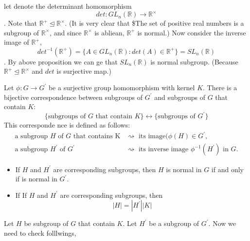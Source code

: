 \documentclass[
]{book}
\providecommand{\tightlist}{%
  \setlength{\itemsep}{0pt}\setlength{\parskip}{0pt}}
\begin{document}
\leavevmode{}%
let denote the determinant homomorphism
\[det:GL_n(\mathbb{R})\to \mathbb{R}^\times\]. Note that
\(\mathbb{R}^+\unlhd \mathbb{R}^\times\). (It is very clear that \$The
set of positive real numbers is a subgroup of \(\mathbb{R}^\times\), and
since \(\mathbb{R}^\times\) is abliean, \(\mathbb{R}^+\) is normal.) Now
consider the inverse image of \(\mathbb{R}^+\),
\[det^{-1}(\mathbb{R}^+)=\{A\in GL_n(\mathbb{R}):det(A)\in \mathbb{R}^+\}=SL_n(\mathbb{R})\].
By above proposition we can ge that \(SL_n(\mathbb{R})\) is normal
subgroup. (Because \(\mathbb{R}^+\unlhd \mathbb{R}^\times\) and \(det\)
is surjective map.)

\leavevmode{}%
Let \(\phi: G \to G^\prime\) be a surjective group homomorphism with
kernel \(K\). There is a bijective correspondence between subgroups of
\(G^\prime\) and subgroups of \(G\) that contain \(K\):
\[\{\text{subgroups of $G$ that contain $K$}\}\longleftrightarrow \{\text{subgroups of $G^\prime$}\}\]
This corresponde nce is defined as follows: \[\begin{aligned}
\text{a subgroup $H$ of $G$ that contains K} &\rightsquigarrow \text{ its image} (\phi(H) \in G^\prime,\\
\text{a subgroup $H^\prime$ of $G^\prime$} &\rightsquigarrow \text{ its inverse image $\phi^{-1}(H^\prime)$ in $G$}.
\end{aligned}\]

\begin{itemize}
\tightlist
\item
  If \(H\) and \(H^\prime\) are corresponding subgroups, then \(H\) is
  normal in \(G\) if and only if is normal in \(G^\prime\).
\item
  If If \(H\) and \(H^\prime\) are corresponding subgroups, then
  \[|H|= |H^\prime||K |\]
\end{itemize}

Let \(H\) be subgroup of \(G\) that contain \(K\). Let \(H^\prime\) be a
subgroup of \(G^\prime\). Now we need to check folllwings,
\end{document}
